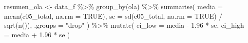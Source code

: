 \documentclass[
  spanish,
  a4paper,
  oneside]{scrbook}
\newenvironment{Shaded}{\begin{snugshade}}{\end{snugshade}}
\newcommand{\AttributeTok}[1]{\textcolor[rgb]{0.40,0.45,0.13}{#1}}
\newcommand{\ConstantTok}[1]{\textcolor[rgb]{0.56,0.35,0.01}{#1}}
\newcommand{\FloatTok}[1]{\textcolor[rgb]{0.68,0.00,0.00}{#1}}
\newcommand{\FunctionTok}[1]{\textcolor[rgb]{0.28,0.35,0.67}{#1}}
\newcommand{\NormalTok}[1]{\textcolor[rgb]{0.00,0.23,0.31}{#1}}
\newcommand{\OtherTok}[1]{\textcolor[rgb]{0.00,0.23,0.31}{#1}}
\newcommand{\SpecialCharTok}[1]{\textcolor[rgb]{0.37,0.37,0.37}{#1}}
\newcommand{\StringTok}[1]{\textcolor[rgb]{0.13,0.47,0.30}{#1}}
\begin{document}
\begin{Shaded}
\begin{Highlighting}[]
\NormalTok{resumen\_ola }\OtherTok{\textless{}{-}}\NormalTok{ data\_f }\SpecialCharTok{\%\textgreater{}\%}
  \FunctionTok{group\_by}\NormalTok{(ola) }\SpecialCharTok{\%\textgreater{}\%}
  \FunctionTok{summarise}\NormalTok{(}
    \AttributeTok{media   =} \FunctionTok{mean}\NormalTok{(c05\_total, }\AttributeTok{na.rm =} \ConstantTok{TRUE}\NormalTok{),}
    \AttributeTok{se      =} \FunctionTok{sd}\NormalTok{(c05\_total, }\AttributeTok{na.rm =} \ConstantTok{TRUE}\NormalTok{) }\SpecialCharTok{/} \FunctionTok{sqrt}\NormalTok{(}\FunctionTok{n}\NormalTok{()),}
    \AttributeTok{.groups =} \StringTok{"drop"}
\NormalTok{  ) }\SpecialCharTok{\%\textgreater{}\%}
  \FunctionTok{mutate}\NormalTok{(}
    \AttributeTok{ci\_low  =}\NormalTok{ media }\SpecialCharTok{{-}} \FloatTok{1.96} \SpecialCharTok{*}\NormalTok{ se,}
    \AttributeTok{ci\_high =}\NormalTok{ media }\SpecialCharTok{+} \FloatTok{1.96} \SpecialCharTok{*}\NormalTok{ se}
\NormalTok{  )}


\end{Highlighting}
\end{Shaded}
\end{document}
